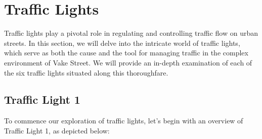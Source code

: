 \section{Traffic Lights} \label{sec:tl}
Traffic lights play a pivotal role in regulating and controlling traffic flow on urban streets. In this section, we will delve into the intricate world of traffic lights, which serve as both the cause and the tool for managing traffic in the complex environment of Vake Street. We will provide an in-depth examination of each of the six traffic lights situated along this thoroughfare.

\subsection{Traffic Light 1} \label{sec:tl-1}
To commence our exploration of traffic lights, let's begin with an overview of Traffic Light 1, as depicted below:

